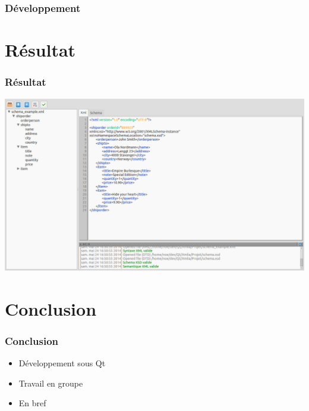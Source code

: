 \documentclass{beamer}
\begin{document}
	\begin{frame}
		\frametitle{Développement}
	\end{frame}



	\section{Résultat}

	\begin{frame}
		\frametitle{Résultat}
		\includegraphics[scale=0.2]{images/final.png}
	\end{frame}


	\section{Conclusion}

	\begin{frame}
		\frametitle{Conclusion}
		\begin{itemize}
			\item Développement sous Qt
			\item Travail en groupe
			\item En bref
		\end{itemize}
	\end{frame}
\end{document}
